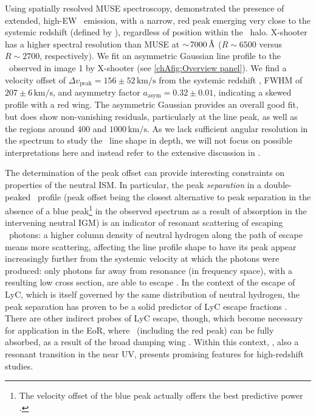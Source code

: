 Using spatially resolved MUSE spectroscopy, \citet{2017MNRAS.467.3306S} demonstrated the presence of extended, high-EW \lya\ emission, with a narrow, red peak emerging very close to the systemic redshift (defined by \OII), regardless of position within the \lya\ halo. X-shooter has a higher spectral resolution than MUSE at $\sim \! 7000 \, \text{\AA}$ ($R \sim 6500$ versus $R \sim 2700$, respectively). We fit an asymmetric Gaussian line profile \citep[see e.g.][]{2014ApJ...788...74S} to the \lya\ observed in image 1 by X-shooter (see \cref{chAfig:Overview panel}). We find a velocity offset of $\Delta v_\text{peak} = 156 \pm 52 \, \mathrm{km/s}$ from the systemic redshift \citep[in agreement with][]{2017MNRAS.467.3306S}, FWHM of $207 \pm 6 \, \mathrm{km/s}$, and asymmetry factor $a_\text{asym} = 0.32 \pm 0.01$, indicating a skewed profile with a red wing. The asymmetric Gaussian provides an overall good fit, but does show non-vanishing residuals, particularly at the line peak, as well as the regions around $400$ and $1000 \, \mathrm{km/s}$. As we lack sufficient angular resolution in the spectrum to study the \lya\ line shape in depth, we will not focus on possible interpretations here and instead refer to the extensive discussion in \citet[][]{2017MNRAS.467.3306S}.

The determination of the peak offset can provide interesting constraints on properties of the neutral ISM. In particular, the peak \emph{separation} in a double-peaked \lya\ profile (peak offset being the closest alternative to peak separation in the absence of a blue peak\footnote{The velocity offset of the blue peak actually offers the best predictive power \citep{2017A&A...597A..13V}.} in the observed spectrum as a result of absorption in the intervening neutral IGM) is an indicator of resonant scattering of escaping \lya\ photons: a higher column density of neutral hydrogen along the path of escape means more scattering, affecting the line profile shape to have its peak appear increasingly further from the systemic velocity at which the photons were produced: only photons far away from resonance (in frequency space), with a resulting low cross section, are able to escape \citep[e.g.][]{2017A&A...597A..13V}. In the context of the escape of LyC, which is itself governed by the same distribution of neutral hydrogen, the peak separation has proven to be a solid predictor of LyC escape fractions \citep{2017A&A...597A..13V, 2018MNRAS.478.4851I, 2020A&A...639A..85G}. There are other indirect probes of LyC escape, though, which become necessary for application in the EoR, where \lya\ (including the red peak) can be fully absorbed, as a result of the broad damping wing \citep[e.g.][]{2014PASA...31...40D}. Within this context, \MgII, also a resonant transition in the near UV, presents promising features for high-redshift studies.

